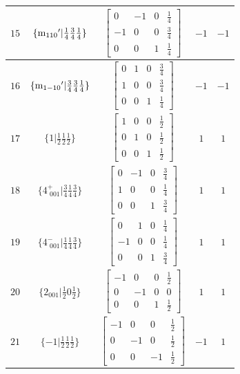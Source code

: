 \documentclass[fleqn,8pt]{jsarticle}
\begin{document}
\begin{longtable}{ccccc}
$ 15 $ & $ \{{\rm m}_{110}{}'|\frac{1}{4} \frac{3}{4} \frac{1}{4}\} $ & $ \begin{bmatrix} 0 & -1 & 0 & \frac{1}{4} \\ -1 & 0 & 0 & \frac{3}{4} \\ 0 & 0 & 1 & \frac{1}{4} \end{bmatrix} $ & $ -1 $ & $ -1 $ \\ \hline
$ 16 $ & $ \{{\rm m}_{1-10}{}'|\frac{3}{4} \frac{3}{4} \frac{1}{4}\} $ & $ \begin{bmatrix} 0 & 1 & 0 & \frac{3}{4} \\ 1 & 0 & 0 & \frac{3}{4} \\ 0 & 0 & 1 & \frac{1}{4} \end{bmatrix} $ & $ -1 $ & $ -1 $ \\ \hline
$ 17 $ & $ \{1|\frac{1}{2} \frac{1}{2} \frac{1}{2}\} $ & $ \begin{bmatrix} 1 & 0 & 0 & \frac{1}{2} \\ 0 & 1 & 0 & \frac{1}{2} \\ 0 & 0 & 1 & \frac{1}{2} \end{bmatrix} $ & $ 1 $ & $ 1 $ \\ \hline
$ 18 $ & $ \{4^{+}_{\,\,001}|\frac{3}{4} \frac{1}{4} \frac{3}{4}\} $ & $ \begin{bmatrix} 0 & -1 & 0 & \frac{3}{4} \\ 1 & 0 & 0 & \frac{1}{4} \\ 0 & 0 & 1 & \frac{3}{4} \end{bmatrix} $ & $ 1 $ & $ 1 $ \\ \hline
$ 19 $ & $ \{4^{-}_{\,\,001}|\frac{1}{4} \frac{1}{4} \frac{3}{4}\} $ & $ \begin{bmatrix} 0 & 1 & 0 & \frac{1}{4} \\ -1 & 0 & 0 & \frac{1}{4} \\ 0 & 0 & 1 & \frac{3}{4} \end{bmatrix} $ & $ 1 $ & $ 1 $ \\ \hline
$ 20 $ & $ \{2{}_{001}|\frac{1}{2} 0 \frac{1}{2}\} $ & $ \begin{bmatrix} -1 & 0 & 0 & \frac{1}{2} \\ 0 & -1 & 0 & 0 \\ 0 & 0 & 1 & \frac{1}{2} \end{bmatrix} $ & $ 1 $ & $ 1 $ \\ \hline
$ 21 $ & $ \{-1|\frac{1}{2} \frac{1}{2} \frac{1}{2}\} $ & $ \begin{bmatrix} -1 & 0 & 0 & \frac{1}{2} \\ 0 & -1 & 0 & \frac{1}{2} \\ 0 & 0 & -1 & \frac{1}{2} \end{bmatrix} $ & $ -1 $ & $ 1 $ \\ \hline

\end{longtable}
\end{document}
